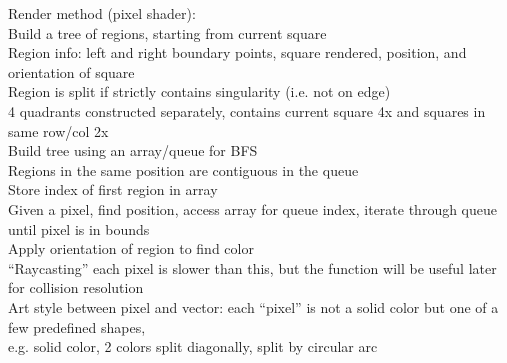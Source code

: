 \documentclass{article}
\begin{document}

Render method (pixel shader): \\
Build a tree of regions, starting from current square \\
Region info: left and right boundary points, square rendered,
position, and orientation of square \\
Region is split if strictly contains singularity (i.e. not on edge) \\
4 quadrants constructed separately,
contains current square 4x and squares in same row/col 2x \\
Build tree using an array/queue for BFS \\
Regions in the same position are contiguous in the queue \\
Store index of first region in array \\
Given a pixel, find position, access array for queue index,
iterate through queue until pixel is in bounds \\
Apply orientation of region to find color \\
``Raycasting'' each pixel is slower than this,
but the function will be useful later for collision resolution \\

Art style between pixel and vector:
each ``pixel'' is not a solid color but one of a few predefined shapes, \\
e.g. solid color, 2 colors split diagonally, split by circular arc \\
\end{document}
